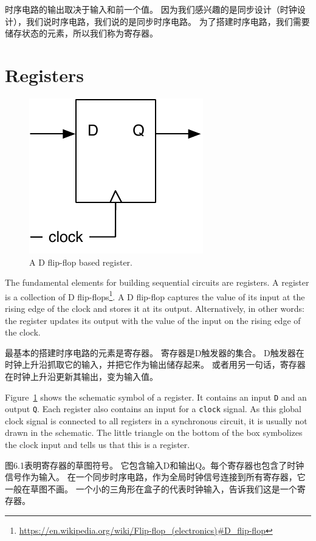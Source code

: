 \documentclass[%
    10pt,
    headinclude, footexclude,
    openright, %
    notitlepage,
    cleardoubleempty,
    headsepline,
    pointlessnumbers,
    bibtotoc, idxtotoc,
    ]{scrbook}
\newcommand{\code}[1]{{\small{\texttt{#1}}}}
\newcommand{\scale}{0.7}
\newcommand{\myref}[2]{\href{#1}{#2}}
\renewcommand{\myref}[2]{{#2}{\footnote{\url{#1}}}}
\begin{document}
时序电路的输出取决于输入和前一个值。
因为我们感兴趣的是同步设计（时钟设计），我们说时序电路，我们说的是同步时序电路。
为了搭建时序电路，我们需要储存状态的元素，所以我们称为寄存器。

\section{Registers}

\begin{figure}
  \centering
  \includegraphics[scale=\scale]{figures/register}
  \caption{A D flip-flop based register.}
  \label{fig:register}
\end{figure}

The fundamental elements for building sequential circuits are registers. A register is a collection
of \myref{https://en.wikipedia.org/wiki/Flip-flop_(electronics)\#D_flip-flop}{D flip-flops}.
A D flip-flop captures the value of its input at the rising edge of the clock and stores
it at its output. Alternatively, in other words: the register updates its output with the value of the input on the rising edge of the clock.

最基本的搭建时序电路的元素是寄存器。
寄存器是D触发器的集合。
D触发器在时钟上升沿抓取它的输入，并把它作为输出储存起来。
或者用另一句话，寄存器在时钟上升沿更新其输出，变为输入值。

Figure~\ref{fig:register} shows the schematic symbol of a register. It contains an input
\code{D} and an output \code{Q}. Each register also contains an input for a \code{clock} signal.
As this global clock signal is connected to all registers in a synchronous circuit, it is usually
not drawn in the schematic. The little triangle on the bottom of the box symbolizes the
clock input and tells us that this is a register.

图6.1表明寄存器的草图符号。
它包含输入D和输出Q。每个寄存器也包含了时钟信号作为输入。
在一个同步时序电路，作为全局时钟信号连接到所有寄存器，它一般在草图不画。
一个小的三角形在盒子的代表时钟输入，告诉我们这是一个寄存器。
\end{document}
